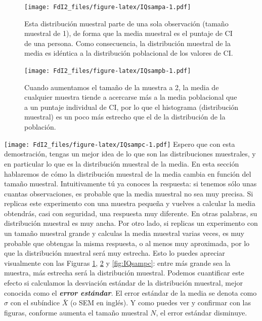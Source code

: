 \documentclass[spanish,]{book}
\begin{document}
\begin{figure}
\centering
\texttt{[image: FdI2\_files/figure-latex/IQsampa-1.pdf]}
\caption{\label{fig:IQsampa}Esta distribución muestral parte de una sola
observación (tamaño muestral de 1), de forma que la media muestral es el
puntaje de CI de una persona. Como consecuencia, la distribución
muestral de la media es idéntica a la distribución poblacional de los
valores de CI.}
\end{figure}

\begin{figure}
\centering
\texttt{[image: FdI2\_files/figure-latex/IQsampb-1.pdf]}
\caption{\label{fig:IQsampb}Cuando aumentamos el tamaño de la muestra a 2,
la media de cualquier muestra tiende a acercarse más a la media
poblacional que a un puntaje individual de CI, por lo que el histograma
(distribución muestral) es un poco más estrecho que el de la
distribución de la población.}
\end{figure}

\texttt{[image: FdI2\_files/figure-latex/IQsampc-1.pdf]} Espero que con
esta demostración, tengas un mejor idea de lo que son las distribuciones
muestrales, y en particular lo que es la distribución muestral de la
media. En esta sección hablaremos de cómo la distribución muestral de la
media cambia en función del tamaño muestral. Intuitivamente tú ya
conoces la respuesta: si tenemos sólo unas cuantas observaciones, es
probable que la media muestral no sea muy precisa. Si replicas este
experimento con una muestra pequeña y vuelves a calcular la media
obtendrás, casi con seguridad, una respuesta muy diferente. En otras
palabras, su distribución muestral es muy ancha. Por otro lado, si
replicas un experimento con un tamaño muestral grande y calculas la
media muestral varias veces, es muy probable que obtengas la misma
respuesta, o al menos muy aproximada, por lo que la distribución
muestral será muy estrecha. Esto lo puedes apreciar visualmente con las
Figuras \ref{fig:IQsampa}, \ref{fig:IQsampb} y \ref{fig:IQsampc}: entre
más grande sea la muestra, más estrecha será la distribución muestral.
Podemos cuantificar este efecto si calculamos la desviación estándar de
la distribución muestral, mejor conocida como el \textbf{\emph{error
estándar}}. El error estándar de la media se denota como \(\sigma\) con
el subíndice \(\bar{X}\) (o SEM en inglés). Y como puedes ver y
confirmar con las figuras, conforme aumenta el tamaño muestral \(N\), el
error estándar disminuye.
\end{document}
